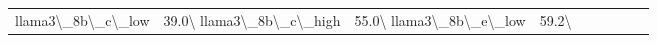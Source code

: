 \begin{table}[htbp]
{\begin{tabular}{lcccccccc}
llama3\textbackslash{}_8b\textbackslash{}_c\textbackslash{}_low & 39.0\textbackslash{}%
llama3\textbackslash{}_8b\textbackslash{}_c\textbackslash{}_high & 55.0\textbackslash{}%
llama3\textbackslash{}_8b\textbackslash{}_e\textbackslash{}_low & 59.2\textbackslash{}%

\end{tabular}}
\end{table}

